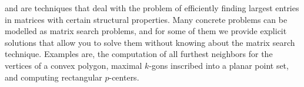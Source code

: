 





 and  
are techniques that deal with the problem of efficiently finding
largest entries in matrices with certain structural properties. Many
concrete problems can be modelled as matrix search problems, and for
some of them we provide explicit solutions that allow you to solve
them without knowing about the matrix search technique. Examples are,
the computation of all furthest neighbors for the vertices of a convex
polygon, maximal $k$-gons inscribed into a planar point set, and
computing rectangular $p$-centers.




